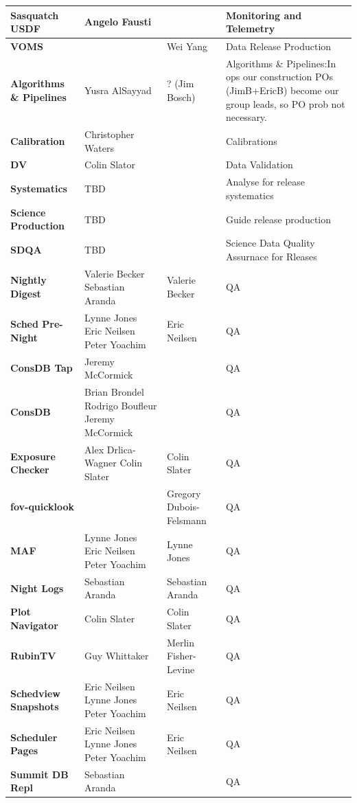 \begin{longtable} {
|p{}   |p{}|p{} |p{}|}
{\textbf{Sasquatch USDF}} & Angelo Fausti &  & Monitoring and Telemetry \\ \hline
{\textbf{VOMS}} &  & Wei Yang & Data Release Production \\ \hline
{\textbf{Algorithms \&  Pipelines}} & Yusra AlSayyad & ? (Jim Bosch) & Algorithms \&  Pipelines:In ops our construction POs (JimB+EricB) become our group leads, so PO prob not necessary. \\ \hline
{\textbf{Calibration}} & Christopher Waters &  & Calibrations \\ \hline
{\textbf{DV}} & Colin Slator &  & Data Validation \\ \hline
{\textbf{Systematics}} & TBD &  & Analyse for release systematics \\ \hline
{\textbf{Science Production}} & TBD &  & Guide release production \\ \hline
{\textbf{SDQA}} & TBD &  & Science Data Quality Assurnace for Rleases \\ \hline
{\textbf{Nightly Digest}} & Valerie Becker
 Sebastian Aranda & Valerie Becker & QA \\ \hline
{\textbf{Sched Pre-Night}} & Lynne Jones
 Eric Neilsen
 Peter Yoachim & Eric Neilsen & QA \\ \hline
{\textbf{ConsDB Tap}} & Jeremy McCormick &  & QA \\ \hline
{\textbf{ConsDB}} & Brian Brondel
 Rodrigo Boufleur
 Jeremy McCormick &  & QA \\ \hline
{\textbf{Exposure Checker}} & Alex Drlica-Wagner
 Colin Slater & Colin Slater & QA \\ \hline
{\textbf{fov-quicklook}} &  & Gregory Dubois-Felsmann & QA \\ \hline
{\textbf{MAF}} & Lynne Jones
 Eric Neilsen
 Peter Yoachim & Lynne Jones & QA \\ \hline
{\textbf{Night Logs}} & Sebastian Aranda & Sebastian Aranda & QA \\ \hline
{\textbf{Plot Navigator}} & Colin Slater & Colin Slater & QA \\ \hline
{\textbf{RubinTV}} & Guy Whittaker & Merlin Fisher-Levine & QA \\ \hline
{\textbf{Schedview Snapshots}} & Eric Neilsen
 Lynne Jones
 Peter Yoachim & Eric Neilsen & QA \\ \hline
{\textbf{Scheduler Pages}} & Eric Neilsen
 Lynne Jones
 Peter Yoachim & Eric Neilsen & QA \\ \hline
{\textbf{Summit DB Repl}} & Sebastian Aranda &  & QA \\ \hline

\end{longtable}
